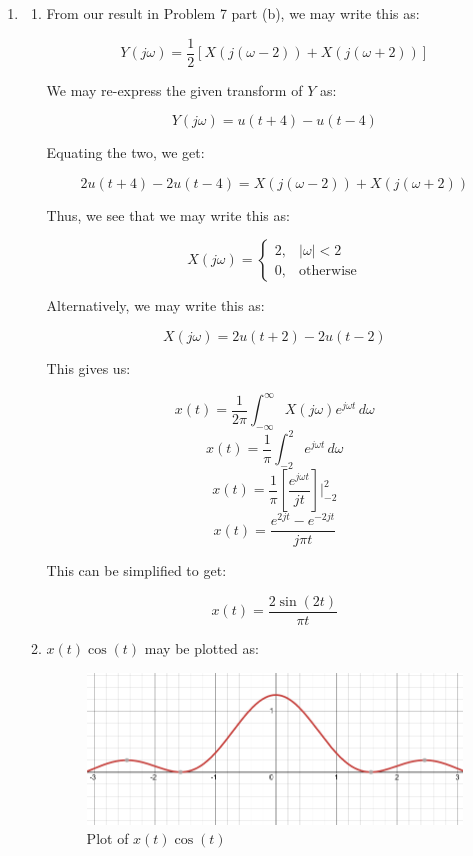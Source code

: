 \begin{enumerate}
\begin{enumerate}
  \end{enumerate}

  \item

    \begin{enumerate}

      \item From our result in Problem 7 part (b), we may write this as:

        $$Y(j\omega)=\frac{1}{2}\left[ X(j(\omega-2))+X(j(\omega+2)) \right]$$

        We may re-express the given transform of $Y$ as:

        $$Y(j\omega)=u(t+4)-u(t-4)$$

        Equating the two, we get:

        $$2u(t+4)-2u(t-4)=X(j(\omega-2))+X(j(\omega+2))$$

        Thus, we see that we may write this as:

        $$\boxed{X(j\omega)=\left\{\begin{array}{ll}2,&|\omega|<2\\0,&\text{otherwise}\end{array}}$$

        Alternatively, we may write this as:

        $$X(j\omega)=2u(t+2)-2u(t-2)$$

        This gives us:

        $$x(t)=\frac{1}{2\pi}\int_{-\infty}^{\infty}X(j\omega)e^{j\omega t}\,d\omega$$
        $$x(t)=\frac{1}{\pi}\int_{-2}^{2}e^{j\omega t}\,d\omega$$
        $$x(t)=\frac{1}{\pi}\left[\frac{e^{j\omega t}}{j t}\right]\Big|_{-2}^{2}$$
        $$x(t)=\frac{e^{2jt}-e^{-2jt}}{j\pi t}$$

        This can be simplified to get:

        $$\boxed{x(t)=\frac{2\sin(2t)}{\pi t}}$$

      \item $x(t)\cos(t)$ may be plotted as:

        \begin{figure}[H]
          \centering
          \includegraphics[width=.8\textwidth]{Figures/HW7-7b}
          \caption{Plot of $x(t)\cos(t)$}
          \label{fig:3}
        \end{figure}


\end{enumerate}
\end{enumerate}
